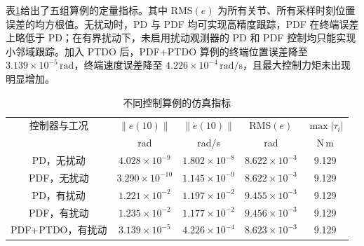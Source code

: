 
表\ref{tab:sim_metrics}给出了五组算例的定量指标。其中 \(\mathrm{RMS}(e)\) 为所有关节、所有采样时刻位置误差的均方根值。无扰动时，PD 与 PDF 均可实现高精度跟踪，PDF 在终端误差上略低于 PD；在有界扰动下，未启用扰动观测器的 PD 和 PDF 控制均只能实现小邻域跟踪。加入 PTDO 后，PDF+PTDO 算例的终端位置误差降至 \(3.139\times10^{-5}\,\mathrm{rad}\)，终端速度误差降至 \(4.226\times10^{-4}\,\mathrm{rad/s}\)，且最大控制力矩未出现明显增加。

\begin{table}[H]
\centering
\caption{不同控制算例的仿真指标}
\label{tab:sim_metrics}
\begin{tabular}{ccccc}
\toprule
控制器与工况 & \(\|e(10)\|\) & \(\|\dot e(10)\|\) & \(\mathrm{RMS}(e)\) & \(\max|\tau_i|\)\\
 & rad & rad/s & rad & N\,m\\
\midrule
PD，无扰动 & \(4.028\times10^{-9}\) & \(1.802\times10^{-8}\) & \(8.622\times10^{-3}\) & 9.129\\
PDF，无扰动 & \(3.290\times10^{-10}\) & \(1.145\times10^{-9}\) & \(8.622\times10^{-3}\) & 9.129\\
PD，有扰动 & \(1.221\times10^{-2}\) & \(1.197\times10^{-2}\) & \(9.455\times10^{-3}\) & 9.129\\
PDF，有扰动 & \(1.235\times10^{-2}\) & \(1.177\times10^{-2}\) & \(9.456\times10^{-3}\) & 9.129\\
PDF+PTDO，有扰动 & \(3.139\times10^{-5}\) & \(4.226\times10^{-4}\) & \(8.623\times10^{-3}\) & 9.129\\
\bottomrule
\end{tabular}
\end{table}